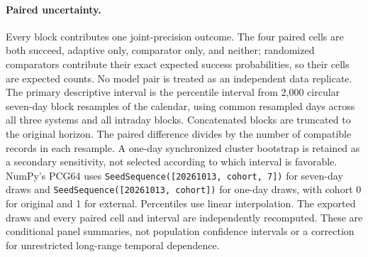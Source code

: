 \paragraph{Paired uncertainty.}
Every block contributes one joint-precision outcome. The four paired cells
are both succeed, adaptive only, comparator only, and neither; randomized
comparators contribute their exact expected success probabilities, so their
cells are expected counts. No model pair is treated as an independent data
replicate. The primary descriptive interval is the percentile interval
from 2,000 circular seven-day block resamples of the calendar, using common
resampled days across all three systems and all intraday blocks. Concatenated
blocks are truncated to the original horizon. The paired difference divides
by the number of compatible records in each resample. A one-day synchronized
cluster bootstrap is retained as a secondary sensitivity, not selected
according to which interval is favorable. NumPy's PCG64 uses
\texttt{SeedSequence([20261013, cohort, 7])} for seven-day draws and
\texttt{SeedSequence([20261013, cohort])} for one-day draws, with cohort 0
for original and 1 for external. Percentiles use linear interpolation.
The exported draws and every paired cell and interval are independently
recomputed. These are conditional panel summaries, not population confidence
intervals or a correction for unrestricted long-range temporal dependence.

